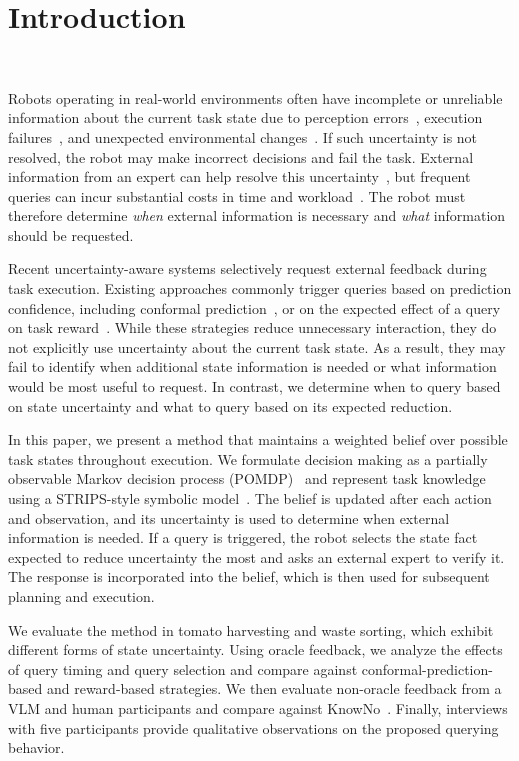\section{Introduction}~\label{intro}

Robots operating in real-world environments often have incomplete or unreliable information about the current task state due to perception errors~\cite{kaipa2016addressing}, execution failures~\cite{kaelbling1998planning}, and unexpected environmental changes~\cite{kurniawati2016online}. If such uncertainty is not resolved, the robot may make incorrect decisions and fail the task. External information from an expert can help resolve this uncertainty~\cite{dragan2013legibility, goodrich2008human}, but frequent queries can incur substantial costs in time and workload~\cite{chen2014human}. The robot must therefore determine \textit{when} external information is necessary and \textit{what} information should be requested.

Recent uncertainty-aware systems selectively request external feedback during task execution. Existing approaches commonly trigger queries based on prediction confidence, including conformal prediction~\cite{ren2023robots, liang2024introspective, mullen2025lbap}, or on the expected effect of a query on task reward~\cite{burks2021collaborative, anand2025adaptive}. While these strategies reduce unnecessary interaction, they do not explicitly use uncertainty about the current task state. As a result, they may fail to identify when additional state information is needed or what information would be most useful to request. In contrast, we determine when to query based on state uncertainty and what to query based on its expected reduction.

In this paper, we present a method that maintains a weighted belief over possible task states throughout execution. We formulate decision making as a partially observable Markov decision process (POMDP)~\cite{kaelbling1998planning} and represent task knowledge using a STRIPS-style symbolic model~\cite{davis1993knowledge,fikes1971strips}. The belief is updated after each action and observation, and its uncertainty is used to determine when external information is needed. If a query is triggered, the robot selects the state fact expected to reduce uncertainty the most and asks an external expert to verify it. The response is incorporated into the belief, which is then used for subsequent planning and execution.


We evaluate the method in tomato harvesting and waste sorting, which exhibit different forms of state uncertainty. Using oracle feedback, we analyze the effects of query timing and query selection and compare against conformal-prediction-based and reward-based strategies. We then evaluate non-oracle feedback from a VLM and human participants and compare against KnowNo~\cite{ren2023robots}. Finally, interviews with five participants provide qualitative observations on the proposed querying behavior.


